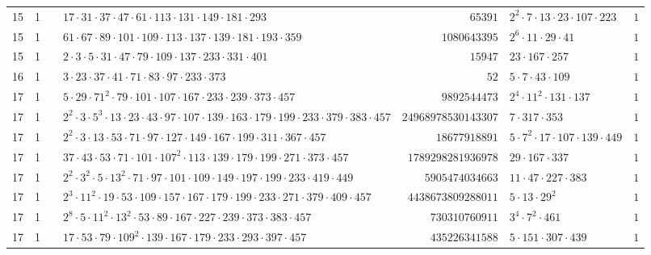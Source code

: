 \documentclass[a4paper,twoside,10pt]{report}
\renewcommand{\checkmark}{\text{\ding{51}}}
\newcommand{\cross}{\text{\ding{55}}}
\begin{document}
\begin{longtable}{rrcp{5cm}rp{5cm}r}
15 & 1 & \cross& $17 \cdot 31 \cdot 37 \cdot 47 \cdot 61 \cdot 113 \cdot 131 \cdot 149 \cdot 181 \cdot 293$ & $65391$ & $2^{2} \cdot 7 \cdot 13 \cdot 23 \cdot 107 \cdot 223$ & $1$\\
15 & 1 & \checkmark& $61 \cdot 67 \cdot 89 \cdot 101 \cdot 109 \cdot 113 \cdot 137 \cdot 139 \cdot 181 \cdot 193 \cdot 359$ & $1080643395$ & $2^{6} \cdot 11 \cdot 29 \cdot 41$ & $1$\\
15 & 1 & \cross& $2 \cdot 3 \cdot 5 \cdot 31 \cdot 47 \cdot 79 \cdot 109 \cdot 137 \cdot 233 \cdot 331 \cdot 401$ & $15947$ & $23 \cdot 167 \cdot 257$ & $1$\\
16 & 1 & \cross& $3 \cdot 23 \cdot 37 \cdot 41 \cdot 71 \cdot 83 \cdot 97 \cdot 233 \cdot 373$ & $52$ & $5 \cdot 7 \cdot 43 \cdot 109$ & $1$\\
17 & 1 & \checkmark& $5 \cdot 29 \cdot 71^{2} \cdot 79 \cdot 101 \cdot 107 \cdot 167 \cdot 233 \cdot 239 \cdot 373 \cdot 457$ & $9892544473$ & $2^{4} \cdot 11^{2} \cdot 131 \cdot 137$ & $1$\\
17 & 1 & \checkmark& $2^{2} \cdot 3 \cdot 5^{3} \cdot 13 \cdot 23 \cdot 43 \cdot 97 \cdot 107 \cdot 139 \cdot 163 \cdot 179 \cdot 199 \cdot 233 \cdot 379 \cdot 383 \cdot 457$ & $24968978530143307$ & $7 \cdot 317 \cdot 353$ & $1$\\
17 & 1 & \checkmark& $2^{2} \cdot 3 \cdot 13 \cdot 53 \cdot 71 \cdot 97 \cdot 127 \cdot 149 \cdot 167 \cdot 199 \cdot 311 \cdot 367 \cdot 457$ & $18677918891$ & $5 \cdot 7^{2} \cdot 17 \cdot 107 \cdot 139 \cdot 449$ & $1$\\
17 & 1 & \checkmark& $37 \cdot 43 \cdot 53 \cdot 71 \cdot 101 \cdot 107^{2} \cdot 113 \cdot 139 \cdot 179 \cdot 199 \cdot 271 \cdot 373 \cdot 457$ & $1789298281936978$ & $29 \cdot 167 \cdot 337$ & $1$\\
17 & 1 & \checkmark& $2^{2} \cdot 3^{2} \cdot 5 \cdot 13^{2} \cdot 71 \cdot 97 \cdot 101 \cdot 109 \cdot 149 \cdot 197 \cdot 199 \cdot 233 \cdot 419 \cdot 449$ & $5905474034663$ & $11 \cdot 47 \cdot 227 \cdot 383$ & $1$\\
17 & 1 & \checkmark& $2^{3} \cdot 11^{2} \cdot 19 \cdot 53 \cdot 109 \cdot 157 \cdot 167 \cdot 179 \cdot 199 \cdot 233 \cdot 271 \cdot 379 \cdot 409 \cdot 457$ & $4438673809288011$ & $5 \cdot 13 \cdot 29^{2}$ & $1$\\
17 & 1 & \checkmark& $2^{8} \cdot 5 \cdot 11^{2} \cdot 13^{2} \cdot 53 \cdot 89 \cdot 167 \cdot 227 \cdot 239 \cdot 373 \cdot 383 \cdot 457$ & $730310760911$ & $3^{4} \cdot 7^{2} \cdot 461$ & $1$\\
17 & 1 & \checkmark& $17 \cdot 53 \cdot 79 \cdot 109^{2} \cdot 139 \cdot 167 \cdot 179 \cdot 233 \cdot 293 \cdot 397 \cdot 457$ & $435226341588$ & $5 \cdot 151 \cdot 307 \cdot 439$ & $1$\\

\end{longtable}
\end{document}
